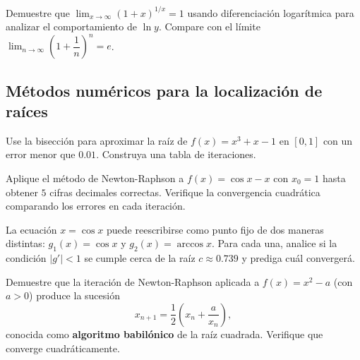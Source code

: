 \begin{prob}
Demuestre que $\displaystyle\lim_{x\to\infty}(1+x)^{1/x} = 1$ usando
diferenciación logarítmica para analizar el comportamiento de $\ln y$.
Compare con el límite $\lim_{n\to\infty}\!\left(1+\dfrac{1}{n}\right)^n = e$.
\end{prob}


\subsection{Métodos numéricos para la localización de raíces}

\begin{prob}
Use la bisección para aproximar la raíz de $f(x)=x^3+x-1$ en $[0,1]$
con un error menor que $0.01$. Construya una tabla de iteraciones.
\end{prob}

\begin{prob}
Aplique el método de Newton-Raphson a $f(x)=\cos x - x$ con $x_0=1$
hasta obtener $5$ cifras decimales correctas. Verifique la convergencia
cuadrática comparando los errores en cada iteración.
\end{prob}

\begin{prob}
La ecuación $x = \cos x$ puede reescribirse como punto fijo de dos
maneras distintas: $g_1(x)=\cos x$ y $g_2(x)=\arccos x$. Para cada
una, analice si la condición $|g'|<1$ se cumple cerca de la raíz
$c\approx 0.739$ y prediga cuál convergerá.
\end{prob}

\begin{prob}
Demuestre que la iteración de Newton-Raphson aplicada a $f(x)=x^2-a$
(con $a>0$) produce la sucesión
\[
x_{n+1}=\frac{1}{2}\!\left(x_n+\frac{a}{x_n}\right),
\]
conocida como \textbf{algoritmo babilónico} de la raíz cuadrada.
Verifique que converge cuadráticamente.
\end{prob}










